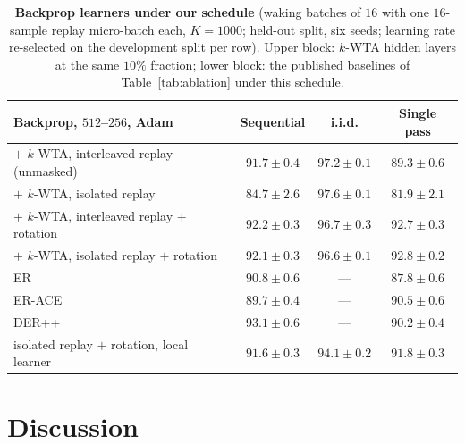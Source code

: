 \documentclass{article}
\newcommand{\kwta}{$k$-WTA}
\begin{document}
\begin{table}[tb]
\centering\footnotesize\renewcommand{\arraystretch}{0.95}
\caption{\textbf{Backprop learners under our schedule} (waking batches of $16$ with one
$16$-sample replay micro-batch each, $K{=}1000$; held-out split, six seeds; learning rate
re-selected on the development split per row). Upper block: \kwta{} hidden layers at the
same $10\%$ fraction; lower block: the published baselines of Table~\ref{tab:ablation} under
this schedule.}
\label{tab:bpk}
\begin{tabular}{@{}lccc@{}}
\toprule
Backprop, $512$--$256$, Adam & Sequential & i.i.d. & Single pass \\
\midrule
$+$ \kwta{}, interleaved replay (unmasked) & $91.7\pm0.4$ & $97.2\pm0.1$ & $89.3\pm0.6$ \\
$+$ \kwta{}, isolated replay & $84.7\pm2.6$ & $97.6\pm0.1$ & $81.9\pm2.1$ \\
$+$ \kwta{}, interleaved replay $+$ rotation & $92.2\pm0.3$ & $96.7\pm0.3$ & $92.7\pm0.3$ \\
$+$ \kwta{}, isolated replay $+$ rotation & $92.1\pm0.3$ & $96.6\pm0.1$ & $92.8\pm0.2$ \\
\midrule
ER & $90.8\pm0.6$ & --- & $87.8\pm0.6$ \\
ER-ACE & $89.7\pm0.4$ & --- & $90.5\pm0.6$ \\
DER++ & $\mathbf{93.1\pm0.6}$ & --- & $90.2\pm0.4$ \\
\midrule
isolated replay $+$ rotation, local learner & $91.6\pm0.3$ & $94.1\pm0.2$ & $\mathbf{91.8\pm0.3}$ \\
\bottomrule
\end{tabular}
\end{table}

\section{Discussion}
\label{sec:discussion}
\end{document}
